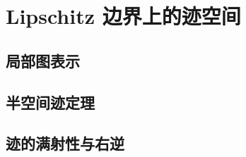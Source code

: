 \section{Lipschitz 边界上的迹空间}
\label{b1:sec:2303}


\subsection{局部图表示}
\label{b1:subsec:230301}

\subsection{半空间迹定理}
\label{b1:subsec:230302}

\subsection{迹的满射性与右逆}
\label{b1:subsec:230303}


